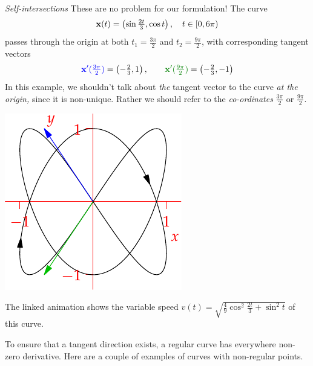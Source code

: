 \begin{tcolorbox}[exstyle,title={}]
\begin{description}
	
		\begin{minipage}[t]{0.68\linewidth}\vspace{-10pt}
			\item[\normalfont\emph{Self-intersections}] These are no problem for our formulation!	The curve
			\[
				{\mathbf{x}}(t)=\left(\sin\tfrac{2t}3,\cos t\right),\quad t\in [0,6\pi)
			\]
		 	passes through the origin at both $t_1=\frac{3\pi}2$ and $t_2=\frac{9\pi}2$, with corresponding tangent vectors
			\[
				\textcolor{blue}{\vx'(\tfrac{3\pi}2)}=\left(-\tfrac 23,1\right),\qquad \textcolor{Green}{\vx'(\tfrac{9\pi}2)}=\left(-\tfrac 23,-1\right)
			\]
			In this example, we shouldn't talk about \emph{the} tangent vector to the curve \emph{at the origin,} since it is non-unique. Rather we should refer to the \emph{co-ordinates} $\frac{3\pi}2$ or $\frac{9\pi}2$.
		\end{minipage}
		\hfill
		\begin{minipage}[t]{0.31\linewidth}\vspace{0pt}
			\flushright	\href{http://www.math.uci.edu/~ndonalds/math162a/curves-selfint.html}{\includegraphics[scale=0.95]{curves-selfint}}
		\end{minipage}\par
		The linked animation shows the variable speed $v(t)=\sqrt{\frac{4}{9}\cos^2\frac{2t}{3}+\sin^2t}$ of this curve.
	\end{description}
\end{tcolorbox}

\goodbreak

 To ensure that a tangent direction exists, a regular curve has everywhere non-zero derivative. Here are a couple of examples of curves with non-regular points.

